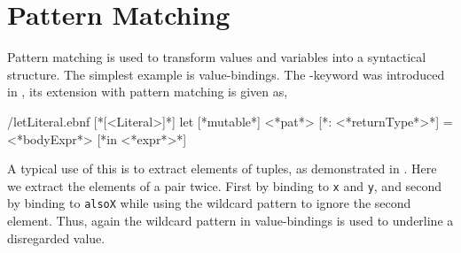 \documentclass[springer.tex]{subfiles}
\begin{document}
\chapter{Pattern Matching}
\label{chap:patterns}


Pattern matching is used to transform values and variables into a syntactical structure. The simplest example is value-bindings. The -keyword was introduced in , its extension with pattern matching is given as,
%
\begin{verbatimwrite}{\ebnf/letLiteral.ebnf}
[*[<Literal>]*]
let [*mutable*] <*pat*> [*: <*returnType*>*] = <*bodyExpr*> [*in <*expr*>*]
\end{verbatimwrite}
%
A typical use of this is to extract elements of tuples, as demonstrated in .
%
%
Here we extract the elements of a pair twice. First by binding to \lstinline{x} and \lstinline{y}, and second by binding to \lstinline{alsoX} while using the wildcard pattern to ignore the second element. Thus, again the wildcard pattern in value-bindings is used to underline a disregarded value.
\end{document}
